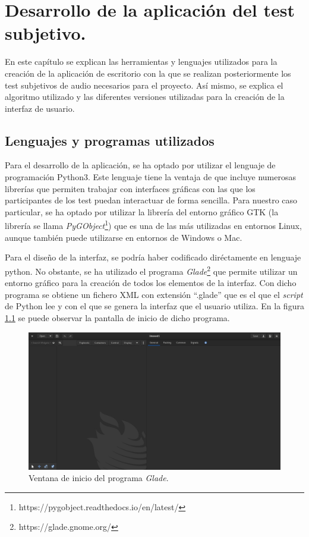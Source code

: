 \documentclass[11pt,a4paper,twoside]{book}
\author{Víctor de Tejada Molera}
\begin{document}
    \chapter{Desarrollo de la aplicación del test subjetivo.}
        En este capítulo se explican las herramientas y lenguajes utilizados para la creación de la aplicación de escritorio con la que se realizan posteriormente los test subjetivos de audio necesarios para el proyecto. Así mismo, se explica el algoritmo utilizado y las diferentes versiones utilizadas para la creación de la interfaz de usuario.
        
        \section{Lenguajes y programas utilizados}
            Para el desarrollo de la aplicación, se ha optado por utilizar el lenguaje de programación Python3. Este lenguaje tiene la ventaja de que incluye numerosas librerías que permiten trabajar con interfaces gráficas con las que los participantes de los test puedan interactuar de forma sencilla. Para nuestro caso particular, se ha optado por utilizar la librería del entorno gráfico GTK (la librería se llama \textit{PyGObject}\footnote{https://pygobject.readthedocs.io/en/latest/}) que es una de las más utilizadas en entornos Linux, aunque también puede utilizarse en entornos de Windows o Mac.
            
            Para el diseño de la interfaz, se podría haber codificado diréctamente en lenguaje python. No obstante, se ha utilizado el programa \textit{Glade}\footnote{https://glade.gnome.org/} que permite utilizar un entorno gráfico para la creación de todos los elementos de la interfaz. Con dicho programa se obtiene un fichero XML con extensión ``.glade'' que es el que el \textit{script} de Python lee y con el que se genera la interfaz que el usuario utiliza. En la figura \ref{fig:gladeInic} se puede observar la pantalla de inicio de dicho programa. 
            
            \begin{figure}[H]
                \begin{center}
                    \includegraphics[scale=.2]{../imagenes/gladeInicio.png}
                    \caption{Ventana de inicio del programa \textit{Glade}.}
                    \label{fig:gladeInic}
                \end{center}
            \end{figure}
            
\end{document}
